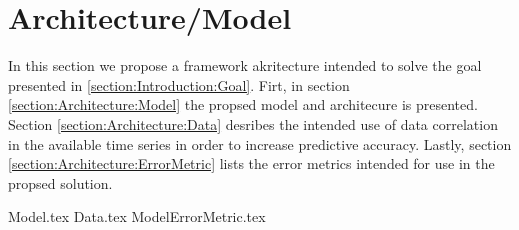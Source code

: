 \chapter{Architecture/Model}
\label{sec:architectureAndModel}

In this section we propose a framework akritecture intended to solve the goal presented in \ref{section:Introduction:Goal}.
Firt, in section \ref{section:Architecture:Model} the propsed model and architecure is presented.
Section \ref{section:Architecture:Data} desribes the intended use of data correlation in the available time series in order to increase predictive accuracy.
Lastly, section \ref{section:Architecture:ErrorMetric} lists the error metrics intended for use in the propsed solution. 

{Model.tex}
{Data.tex}
{ModelErrorMetric.tex}


\iffalse
Here you will present the architecture or model that you have chosen and that is (or will be) implemented in your work. Note that putting algorithms in your report is not desirable but in certain cases these might be placed in the appendix. Code further be avoided in the report itself but may be delivered in the fashion requested by the supervisor or, in the case of masters delivery, submitted as additional documents. 
\fi
